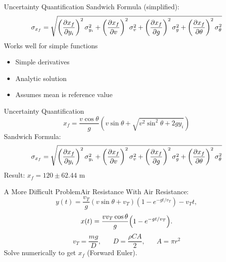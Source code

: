 \documentclass{beamer}
\begin{document}
\begin{frame}{Uncertainty Quantification}\vspace{-20pt}
Sandwich Formula (simplified):
\begin{equation*}
\sigma_{x_f} = \sqrt{\left(\pdv{x_f}{y_i}\right)^2\sigma_{y_i}^2 + \left(\pdv{x_f}{v}\right)^2\sigma_{v}^2 + \left(\pdv{x_f}{g}\right)^2\sigma_{g}^2 + \left(\pdv{x_f}{\theta}\right)^2\sigma_{\theta}^2}
\end{equation*}
Works well for simple functions
\begin{itemize}
\item Simple derivatives
\item Analytic solution
\item Assumes mean is reference value
\end{itemize}
\end{frame}

\begin{frame}{Uncertainty Quantification}\vspace{-30pt}
\begin{equation*}
x_f=\frac{v\cos{\theta}}{g}\left(v\sin\theta+\sqrt{v^2\sin^2\theta + 2gy_i}\right)
\end{equation*}%
Sandwich Formula:
\[\sigma_{x_f} = \sqrt{\left(\pdv{x_f}{y_i}\right)^2\sigma_{y_i}^2 + \left(\pdv{x_f}{v}\right)^2\sigma_{v}^2 + \left(\pdv{x_f}{g}\right)^2\sigma_{g}^2 + \left(\pdv{x_f}{\theta}\right)^2\sigma_{\theta}^2}\]%
Result: $x_f=120\pm62.44$ m  \vspace{10pt}\\
\end{frame}


\begin{frame}{A More Difficult Problem}{Air Resistance}
\vspace{-20pt}With Air Resistance:
\begin{equation*}
y(t)=\frac{v_T}{g}(v\sin\theta+v_T)\left(1-e^{-gt/v_T}\right)-v_Tt,
\end{equation*}
\begin{equation*}
x(t)=\frac{vv_T\cos\theta}{g}\qty(1-e^{-gt/v_T}).
\end{equation*}
\begin{equation*}
v_T=\frac{mg}{D},\hspace{20pt}D=\frac{\rho C A}{2},\hspace{20pt}A=\pi r^2
\end{equation*}
\hspace{30pt}Solve numerically to get $x_f$ (Forward Euler).
\end{frame}
\end{document}
